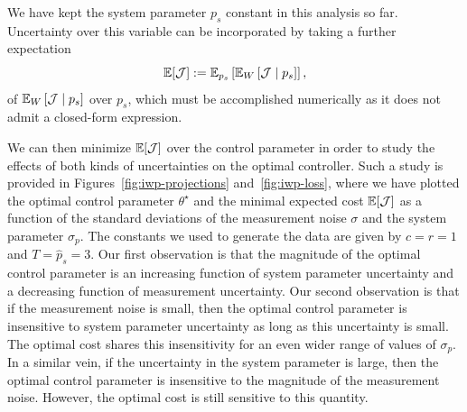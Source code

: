 
We have kept the system parameter $p_s$ constant in this analysis so far.
Uncertainty over this variable can be incorporated by taking a further
expectation \[ \mathbb{E}[\mathcal{J}] := \mathbb{E}_{p_s}\left[\mathbb{E}_W\left[\mathcal{J}
\mid p_s \right]\right], \] of $\mathbb{E}_W\left[\mathcal{J} \mid p_s \right]$ over $p_s$,
which must be accomplished numerically as it does not admit a closed-form
expression.  

We can then minimize $\mathbb{E}[\mathcal{J}]$ over the control parameter in order to
study the effects of both kinds of uncertainties on the optimal controller.
%
Such a study is provided in Figures~\ref{fig:iwp-projections}
and~\ref{fig:iwp-loss}, where we have plotted the optimal control parameter
$\theta^\star$ and the minimal expected cost $\mathbb{E}[\mathcal{J}]$ as a function
of the standard deviations of the measurement noise $\sigma$ and the system
parameter $\sigma_p$. The constants we used to generate the data are given by
$c=r=1$ and $T=\hat{p}_s=3$. Our first observation is that the magnitude of the
optimal control parameter is an increasing function of system parameter
uncertainty and a decreasing function of measurement uncertainty. Our second
observation is that if the measurement noise is small, then the optimal control
parameter is insensitive to system parameter uncertainty as long as this
uncertainty is small. The optimal cost shares this insensitivity for an even
wider range of values of $\sigma_p$. In a similar vein, if the uncertainty in
the system parameter is large, then the optimal control parameter is insensitive
to the magnitude of the measurement noise. However, the optimal cost is still
sensitive to this quantity.

